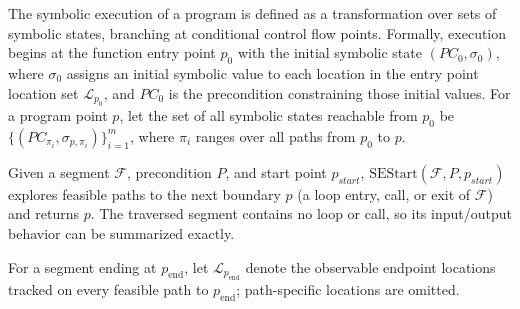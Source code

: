 The symbolic execution of a program is defined as a transformation over
sets of symbolic states, branching at conditional control flow points.
Formally, execution begins at the function entry point $p_0$ with the
initial symbolic state $(PC_0,\sigma_0)$, where $\sigma_0$ assigns an
initial symbolic value to each location in the entry point location set
$\mathcal{L}_{p_0}$, and $PC_0$ is the precondition constraining those
initial values. For a program point $p$, let the set of all symbolic
states reachable from $p_0$ be
$\{(PC_{\pi_i},\sigma_{p,\pi_i})\}_{i=1}^{m}$, where $\pi_i$ ranges over
all paths from $p_0$ to $p$.


Given a segment $\mathcal F$, precondition $P$, and start point $p_{\mathit{start}}$, $\mathrm{SEStart}(\mathcal F,P,p_{\mathit{start}})$ explores feasible paths to the next boundary $p$ (a loop entry, call, or exit of $\mathcal F$) and returns $p$. The traversed segment contains no loop or call, so its input/output behavior can be summarized exactly.

For a segment ending at $p_{\mathrm{end}}$, let
$\mathcal{L}_{p_{\mathrm{end}}}$ denote the observable endpoint
locations tracked on every feasible path to $p_{\mathrm{end}}$;
path-specific locations are omitted.


